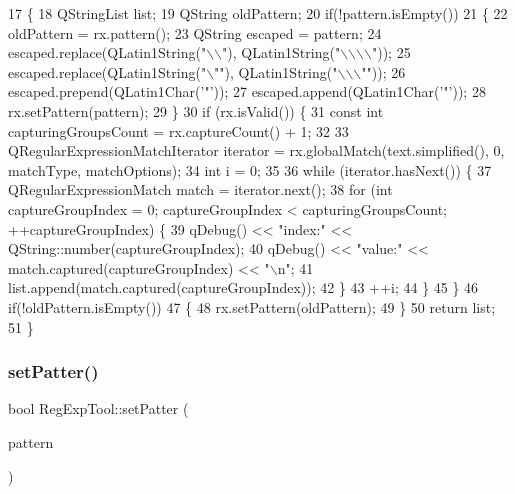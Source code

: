 \begin{DoxyCode}
17 \{
18     QStringList list;
19     QString oldPattern;
20     \textcolor{keywordflow}{if}(!pattern.isEmpty())
21     \{
22         oldPattern = rx.pattern();
23         QString escaped = pattern;
24         escaped.replace(QLatin1String(\textcolor{stringliteral}{"\(\backslash\)\(\backslash\)"}), QLatin1String(\textcolor{stringliteral}{"\(\backslash\)\(\backslash\)\(\backslash\)\(\backslash\)"}));
25         escaped.replace(QLatin1String(\textcolor{stringliteral}{"\(\backslash\)""}), QLatin1String(\textcolor{stringliteral}{"\(\backslash\)\(\backslash\)\(\backslash\)""}));
26         escaped.prepend(QLatin1Char(\textcolor{charliteral}{'"'}));
27         escaped.append(QLatin1Char(\textcolor{charliteral}{'"'}));
28         rx.setPattern(pattern);
29     \}
30     \textcolor{keywordflow}{if} (rx.isValid()) \{
31         \textcolor{keyword}{const} \textcolor{keywordtype}{int} capturingGroupsCount = rx.captureCount() + 1;
32 
33         QRegularExpressionMatchIterator iterator = rx.globalMatch(text.simplified(), 0, matchType, 
      matchOptions);
34         \textcolor{keywordtype}{int} i = 0;
35 
36         \textcolor{keywordflow}{while} (iterator.hasNext()) \{
37             QRegularExpressionMatch match = iterator.next();
38             \textcolor{keywordflow}{for} (\textcolor{keywordtype}{int} captureGroupIndex = 0; captureGroupIndex < capturingGroupsCount; ++captureGroupIndex) 
      \{
39                 qDebug() << \textcolor{stringliteral}{"index:"} << QString::number(captureGroupIndex);
40                 qDebug() << \textcolor{stringliteral}{"value:"} << match.captured(captureGroupIndex) << \textcolor{stringliteral}{"\(\backslash\)n"};
41                 list.append(match.captured(captureGroupIndex));
42             \}
43             ++i;
44         \}
45     \}
46     \textcolor{keywordflow}{if}(!oldPattern.isEmpty())
47     \{
48         rx.setPattern(oldPattern);
49     \}
50     \textcolor{keywordflow}{return} list;
51 \}
\end{DoxyCode}
\mbox{\label{class_reg_exp_tool_a91de829aa5c85a794348421a28b4b73c}} 
\subsubsection{\texorpdfstring{set\+Patter()}{setPatter()}}
{\footnotesize\ttfamily bool Reg\+Exp\+Tool\+::set\+Patter (\begin{DoxyParamCaption}\item[{Q\+String}]{pattern }\end{DoxyParamCaption})}



